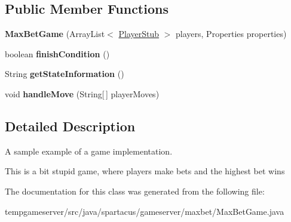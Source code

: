 \subsection*{Public Member Functions}
\begin{DoxyCompactItemize}
\item 
\hypertarget{classspartacus_1_1gameserver_1_1maxbet_1_1MaxBetGame_a4a1ae8670de528eaa5671a4d2941cd74}{
{\bfseries \-M\-a\-x\-B\-e\-t\-G\-a\-m\-e} \-(\-A\-r\-r\-a\-y\-L\-i\-s\-t$<$ \hyperlink{classspartacus_1_1gameserver_1_1PlayerStub}{\-P\-l\-a\-y\-e\-r\-S\-t\-u\-b} $>$ \-p\-l\-a\-y\-e\-r\-s, \-P\-r\-o\-p\-e\-r\-t\-i\-e\-s \-p\-r\-o\-p\-e\-r\-t\-i\-e\-s\-)}
\label{classspartacus_1_1gameserver_1_1maxbet_1_1MaxBetGame_a4a1ae8670de528eaa5671a4d2941cd74}

\item 
\hypertarget{classspartacus_1_1gameserver_1_1maxbet_1_1MaxBetGame_ae50f70ea827feb9944ee13a11eaeb81f}{
\-b\-o\-o\-l\-e\-a\-n {\bfseries \-f\-i\-n\-i\-s\-h\-C\-o\-n\-d\-i\-t\-i\-o\-n} \-(\-)}
\label{classspartacus_1_1gameserver_1_1maxbet_1_1MaxBetGame_ae50f70ea827feb9944ee13a11eaeb81f}

\item 
\hypertarget{classspartacus_1_1gameserver_1_1maxbet_1_1MaxBetGame_ae9167168248520bccca0f631206ad51f}{
\-S\-t\-r\-i\-n\-g {\bfseries \-g\-e\-t\-S\-t\-a\-t\-e\-I\-n\-f\-o\-r\-m\-a\-t\-i\-o\-n} \-(\-)}
\label{classspartacus_1_1gameserver_1_1maxbet_1_1MaxBetGame_ae9167168248520bccca0f631206ad51f}

\item 
\hypertarget{classspartacus_1_1gameserver_1_1maxbet_1_1MaxBetGame_a991e9f9dd74c0ca39cc7c96c86b582d6}{
\-v\-o\-i\-d {\bfseries \-h\-a\-n\-d\-l\-e\-M\-o\-v\-e} \-(\-S\-t\-r\-i\-n\-g\mbox{[}$\,$\mbox{]} \-p\-l\-a\-y\-e\-r\-M\-o\-v\-e\-s\-)}
\label{classspartacus_1_1gameserver_1_1maxbet_1_1MaxBetGame_a991e9f9dd74c0ca39cc7c96c86b582d6}

\end{DoxyCompactItemize}


\subsection{Detailed Description}
A sample example of a game implementation. 

This is a bit stupid game, where players make bets and the highest bet wins 

The documentation for this class was generated from the following file:\begin{DoxyCompactItemize}
\item 
\-t\-e\-m\-p\-g\-a\-m\-e\-s\-e\-r\-v\-e\-r\-/\-s\-r\-c\-/\-j\-a\-v\-a\-/\-s\-p\-a\-r\-t\-a\-c\-u\-s\-/\-g\-a\-m\-e\-s\-e\-r\-v\-e\-r\-/\-m\-a\-x\-b\-e\-t\-/\-M\-a\-x\-B\-e\-t\-G\-a\-m\-e\-.\-j\-a\-v\-a\end{DoxyCompactItemize}

